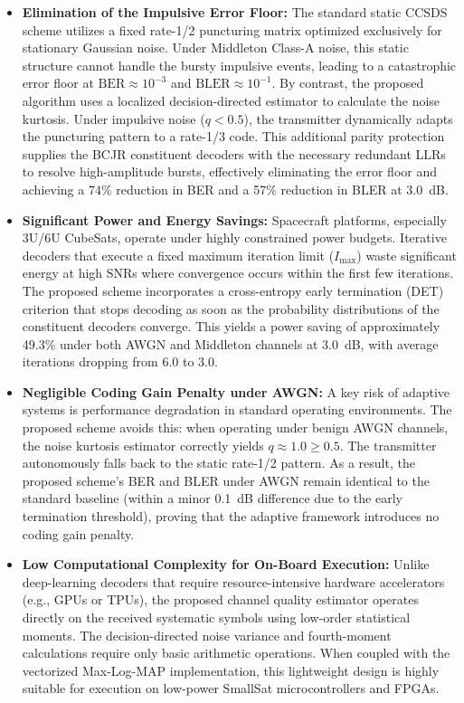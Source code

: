 \documentclass[journal,twocolumn]{IEEEtran}
\begin{document}
\begin{itemize}
  \item \textbf{Elimination of the Impulsive Error Floor:} The standard static CCSDS scheme utilizes a fixed rate-1/2 puncturing matrix optimized exclusively for stationary Gaussian noise. Under Middleton Class-A noise, this static structure cannot handle the bursty impulsive events, leading to a catastrophic error floor at $\text{BER} \approx 10^{-3}$ and $\text{BLER} \approx 10^{-1}$. By contrast, the proposed algorithm uses a localized decision-directed estimator to calculate the noise kurtosis. Under impulsive noise ($q < 0.5$), the transmitter dynamically adapts the puncturing pattern to a rate-1/3 code. This additional parity protection supplies the BCJR constituent decoders with the necessary redundant LLRs to resolve high-amplitude bursts, effectively eliminating the error floor and achieving a 74\% reduction in BER and a 57\% reduction in BLER at 3.0~dB.
  \item \textbf{Significant Power and Energy Savings:} Spacecraft platforms, especially 3U/6U CubeSats, operate under highly constrained power budgets. Iterative decoders that execute a fixed maximum iteration limit ($I_{\max}$) waste significant energy at high SNRs where convergence occurs within the first few iterations. The proposed scheme incorporates a cross-entropy early termination (DET) criterion that stops decoding as soon as the probability distributions of the constituent decoders converge. This yields a power saving of approximately 49.3\% under both AWGN and Middleton channels at 3.0~dB, with average iterations dropping from 6.0 to 3.0.
  \item \textbf{Negligible Coding Gain Penalty under AWGN:} A key risk of adaptive systems is performance degradation in standard operating environments. The proposed scheme avoids this: when operating under benign AWGN channels, the noise kurtosis estimator correctly yields $q \approx 1.0 \geq 0.5$. The transmitter autonomously falls back to the static rate-1/2 pattern. As a result, the proposed scheme's BER and BLER under AWGN remain identical to the standard baseline (within a minor 0.1~dB difference due to the early termination threshold), proving that the adaptive framework introduces no coding gain penalty.
  \item \textbf{Low Computational Complexity for On-Board Execution:} Unlike deep-learning decoders that require resource-intensive hardware accelerators (e.g., GPUs or TPUs), the proposed channel quality estimator operates directly on the received systematic symbols using low-order statistical moments. The decision-directed noise variance and fourth-moment calculations require only basic arithmetic operations. When coupled with the vectorized Max-Log-MAP implementation, this lightweight design is highly suitable for execution on low-power SmallSat microcontrollers and FPGAs.
\end{itemize}
\end{document}
